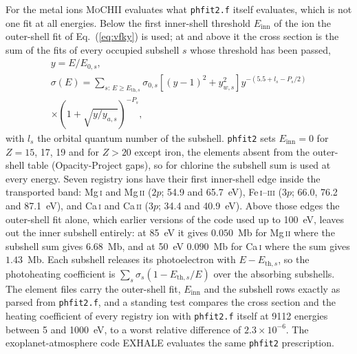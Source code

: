 \documentclass[twocolumn,linenumbers]{aastex702}
\newcommand{\code}[1]{\texttt{#1}}
\newcommand{\MoCHII}{\textsc{MoCHII}}
\begin{document}
For the metal ions \MoCHII{} evaluates what \code{phfit2.f} itself
evaluates, which is not one fit at all energies.  Below the first
inner-shell threshold $E_{\mathrm{inn}}$ of the ion the outer-shell fit of
Eq.~(\ref{eq:vfky}) is used; at and above it the cross section is the sum of
the \citet{verner1995} fits of every occupied subshell $s$ whose threshold
has been passed,
\begin{gather}
  y = E/E_{0,s},
  \nonumber\\
  \sigma(E) = \sum_{s:\,E \ge E_{\mathrm{th},s}} \sigma_{0,s}
  \left[(y-1)^2 + y_{w,s}^2\right] y^{-(5.5 + l_s - P_s/2)}
  \nonumber\\
  \times\left(1 + \sqrt{y/y_{a,s}}\right)^{-P_s},
  \label{eq:vy95}
\end{gather}%
with $l_s$ the orbital quantum number of the subshell.  \code{phfit2} sets
$E_{\mathrm{inn}} = 0$ for $Z = 15$, 17, 19 and for $Z > 20$ except iron,
the elements absent from the outer-shell table (Opacity-Project gaps), so
for chlorine the subshell sum is used at every energy.  Seven registry ions
have their first inner-shell edge inside the transported band:
Mg\,\textsc{i} and Mg\,\textsc{ii} ($2p$; 54.9 and 65.7~eV),
Fe\,\textsc{i}--\textsc{iii} ($3p$; 66.0, 76.2 and 87.1~eV), and
Ca\,\textsc{i} and Ca\,\textsc{ii} ($3p$; 34.4 and 40.9~eV).  Above those
edges the outer-shell fit alone, which earlier versions of the code used up
to 100~eV, leaves out the inner subshell entirely: at 85~eV it gives
$0.050$~Mb for Mg\,\textsc{ii} where the subshell sum gives $6.68$~Mb, and
at 50~eV $0.090$~Mb for Ca\,\textsc{i} where the sum gives $1.43$~Mb.  Each
subshell releases its photoelectron with $E - E_{\mathrm{th},s}$, so the
photoheating coefficient is $\sum_s \sigma_s (1 - E_{\mathrm{th},s}/E)$ over
the absorbing subshells.  The element files carry the outer-shell fit,
$E_{\mathrm{inn}}$ and the subshell rows exactly as parsed from
\code{phfit2.f}, and a standing test compares the cross section and the
heating coefficient of every registry ion with \code{phfit2.f} itself at
9112 energies between 5 and 1000~eV, to a worst relative difference of
$2.3\times10^{-6}$.  The exoplanet-atmosphere code EXHALE evaluates the
same \code{phfit2} prescription.
\end{document}
